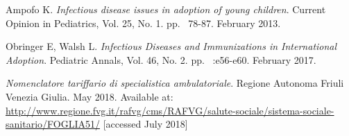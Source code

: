 \begin{thebibliography}{50}
  Ampofo K.
  \textit{Infectious disease issues in adoption of young children}.
  Current Opinion in Pediatrics, Vol. 25, No. 1.
  pp. ~78-87.
  February 2013.
  
  Obringer E, Walsh L.
  \textit{Infectious Diseases and Immunizations in International Adoption}.
  Pediatric Annals, Vol. 46, No. 2.
  pp. ~:e56-e60.
  February 2017.
  
  \textit{Nomenclatore tariffario di specialistica ambulatoriale}.
  Regione Autonoma Friuli Venezia Giulia.
  May 2018.
  Available at: \url{http://www.regione.fvg.it/rafvg/cms/RAFVG/salute-sociale/sistema-sociale-sanitario/FOGLIA51/} [accessed July 2018]

\end{thebibliography}